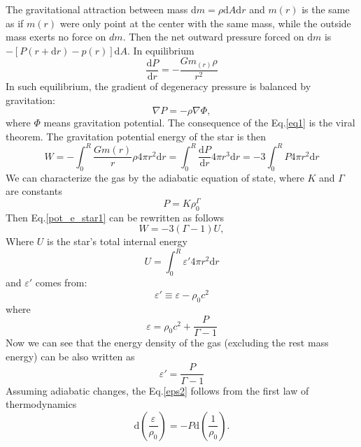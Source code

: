 \documentclass[oneside,a4paper,11pt]{report}
\begin{document}
The gravitational attraction between mass $\mathrm{d}m = \rho \mathrm{d}A \mathrm{d}r$ and $m(r)$ is the same as if $m(r)$ were only point at the center with the same mass, while the outside mass exerts no force on $dm$.
Then the net outward pressure forced on $\mathrm{d}m$ is $- \left [ P\left ( r + \mathrm{d}r \right ) - p(r)  \right ]\mathrm{d}A$. In equilibrium 
\begin{equation}
\label{eq1}
 \frac{\mathrm{d}P}{\mathrm{d}r} = - \frac{Gm_{(r)}\rho}{r^2}
\end{equation}
In such equilibrium, the gradient of degeneracy pressure is balanced by gravitation: 
\begin{equation}
\label{equ_1}
\nabla P = -\rho \nabla \Phi, 
\end{equation}
where $\Phi$ means gravitation potential.  
The consequence of the Eq.\eqref{eq1} is the viral theorem. The gravitation potential energy of the star is then 
\begin{equation}
\label{pot_e_star1}
W = -\int_{0}^{R} \frac{Gm(r)}{r}\rho 4 \pi r^2 \mathrm{d}r = \int_{0}^{R} \frac{\mathrm{d}P}{\mathrm{d}r}4\pi r^3 \mathrm{d}r = -3\int_{0}^{R} P4 \pi r^2 \mathrm{d}r
\end{equation}
We can characterize the gas by the adiabatic equation of state, where $K$ and $\Gamma$ are constants
\begin{equation}
 \label{adiab_1}
P = K\rho_0^\Gamma
\end{equation}
Then Eq.\eqref{pot_e_star1} can be rewritten as follows
\begin{equation}
 W = -3 (\Gamma - 1) U,
\end{equation}
Where $U$ is the star's total internal energy 
\begin{equation}
U = \int_{0}^{R}\varepsilon' 4\pi r^2 \mathrm{d}r 
\end{equation}
and $\varepsilon'$ comes from:
\begin{equation}
\label{eps1}
 \varepsilon' \equiv \varepsilon - \rho_0 c^2
\end{equation}
where
\begin{equation}
 \varepsilon = \rho_0c^2+\frac{P}{\Gamma -1}
\end{equation}
Now we can see that the energy density of the gas (excluding the rest mass energy) can be also written as
\begin{equation}
 \label{eps2}
 \varepsilon'=\frac{P}{\Gamma - 1}
\end{equation}
Assuming adiabatic changes, the Eq.\eqref{eps2} follows from the first law of thermodynamics
\begin{equation}
 \mathrm{d}\left ( \frac{\varepsilon }{\rho_0} \right ) = -P\mathrm{d}\left ( \frac{1}{\rho_0} \right ) .
\end{equation}
\end{document}
